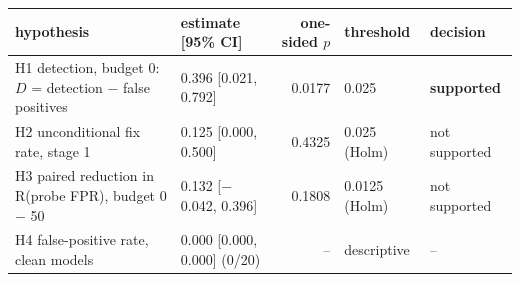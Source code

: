 \begin{tabular}{p{5.6cm}lrll}
\toprule
hypothesis & estimate [95\% CI] & one-sided $p$ & threshold & decision \\
\midrule
H1 detection, budget 0: $D$ = detection $-$ false positives & 0.396 [0.021, 0.792] & 0.0177 & 0.025 & \textbf{supported} \\
H2 unconditional fix rate, stage 1 & 0.125 [0.000, 0.500] & 0.4325 & 0.025 (Holm) & not supported \\
H3 paired reduction in R(probe FPR), budget 0 $-$ 50 & 0.132 [$-$0.042, 0.396] & 0.1808 & 0.0125 (Holm) & not supported \\
H4 false-positive rate, clean models & 0.000 [0.000, 0.000] (0/20) & -- & descriptive & -- \\
\bottomrule
\end{tabular}
